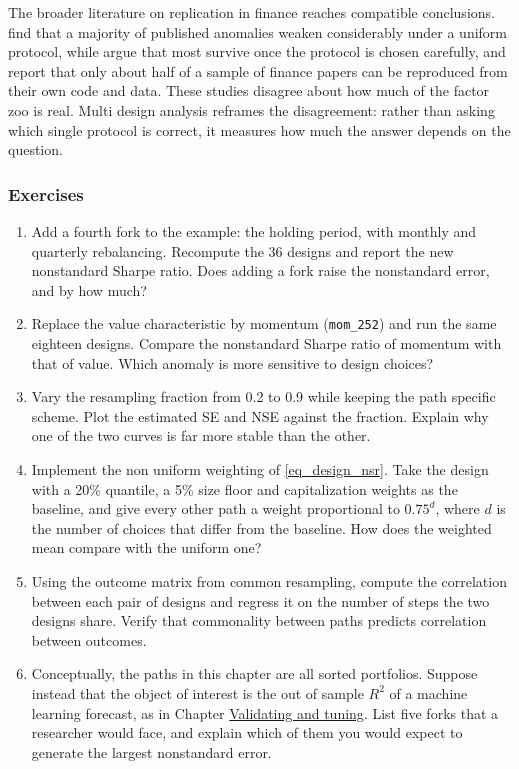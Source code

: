 The broader literature on replication in finance reaches compatible conclusions. \cite{hou2020replicating} find that a majority of published anomalies weaken considerably under a uniform protocol, while \cite{jensen2021there} argue that most survive once the protocol is chosen carefully, and \cite{perignon2022reproducibility} report that only about half of a sample of finance papers can be reproduced from their own code and data. These studies disagree about how much of the factor zoo is real. Multi design analysis reframes the disagreement: rather than asking which single protocol is correct, it measures how much the answer depends on the question.

\subsubsection{Exercises}

\begin{enumerate}
\item Add a fourth fork to the example: the holding period, with monthly and quarterly rebalancing. Recompute the 36 designs and report the new nonstandard Sharpe ratio. Does adding a fork raise the nonstandard error, and by how much?
\item Replace the value characteristic by momentum (\texttt{mom\_252}) and run the same eighteen designs. Compare the nonstandard Sharpe ratio of momentum with that of value. Which anomaly is more sensitive to design choices?
\item Vary the resampling fraction from 0.2 to 0.9 while keeping the path specific scheme. Plot the estimated SE and NSE against the fraction. Explain why one of the two curves is far more stable than the other.
\item Implement the non uniform weighting of \ref{eq_design_nsr}. Take the design with a 20\% quantile, a 5\% size floor and capitalization weights as the baseline, and give every other path a weight proportional to $0.75^{d}$, where $d$ is the number of choices that differ from the baseline. How does the weighted mean compare with the uniform one?
\item Using the outcome matrix from common resampling, compute the correlation between each pair of designs and regress it on the number of steps the two designs share. Verify that commonality between paths predicts correlation between outcomes.
\item Conceptually, the paths in this chapter are all sorted portfolios. Suppose instead that the object of interest is the out of sample $R^2$ of a machine learning forecast, as in Chapter \href{/chap-13-validating-tuning}{Validating and tuning}. List five forks that a researcher would face, and explain which of them you would expect to generate the largest nonstandard error.
\end{enumerate}